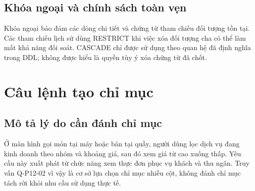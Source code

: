 \subsection{Khóa ngoại và chính sách toàn vẹn}
Khóa ngoại bảo đảm các dòng chi tiết và chứng từ tham chiếu đối tượng tồn tại. Các tham chiếu lịch sử dùng RESTRICT khi việc xóa đối tượng cha có thể làm mất khả năng đối soát. CASCADE chỉ được sử dụng theo quan hệ đã định nghĩa trong DDL; không được hiểu là quyền tùy ý xóa chứng từ đã chốt.
\section{Câu lệnh tạo chỉ mục}\label{sec:index}
\subsection{Mô tả lý do cần đánh chỉ mục}
Ở màn hình gọi món tại máy hoặc bán tại quầy, người dùng lọc dịch vụ đang kinh doanh theo nhóm và khoảng giá, sau đó xem giá từ cao xuống thấp. Yêu cầu này xuất phát từ chức năng xem thực đơn phục vụ khách và thu ngân. Truy vấn Q-P12-02 vì vậy là cơ sở lựa chọn chỉ mục nhiều cột, không đánh chỉ mục tách rời khỏi nhu cầu sử dụng thực tế.
